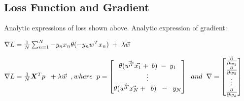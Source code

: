 \documentclass[12pt]{article}
\begin{document}
\subsection{Loss Function and Gradient}
Analytic expressions of loss shown above.
Analytic expression of gradient:
\begin{center}
  $\nabla L = \frac{1}{N} \sum_{n=1}^{N} -y_nx_n\theta (-y_nw^Tx_n) \hspace{1mm}+ \hspace{1mm} \lambda \vec{w} $

  $\nabla L = \frac{1}{N}\boldsymbol{X}^Tp \hspace{2mm} + \lambda \vec{w}\hspace{2mm}, where \hspace{2mm} p = \begin{bmatrix}
      \theta(\vec{w^T}\vec{x_1} + \hspace{1mm}b) \hspace{1mm}-\hspace{1mm}y_1 \\
      \vdots                                                                  \\
      \theta(\vec{w^T}\vec{x_N} + \hspace{2mm}b) \hspace{2mm}-\hspace{2mm}y_N \\
    \end{bmatrix} \hspace{2mm} and \hspace{2mm} \nabla = \begin{bmatrix}
      \frac{\partial}{\partial{w_1}} \\
      \frac{\partial}{\partial{w_2}} \\
      \vdots                         \\
      \frac{\partial}{\partial{w_d}} \\
    \end{bmatrix}$


\end{center}
\end{document}
